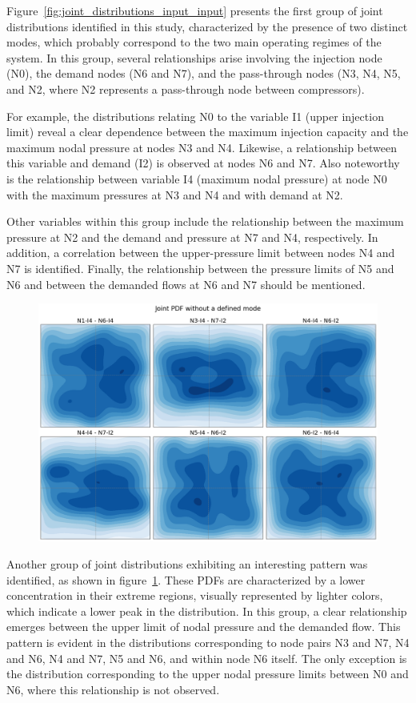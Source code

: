 Figure~\cref{fig:joint_distributions_input_input} presents the first group of joint distributions identified in this study, characterized by the presence of two distinct modes, which probably correspond to the two main operating regimes of the system. In this group, several relationships arise involving the injection node (N0), the demand nodes (N6 and N7), and the pass-through nodes (N3, N4, N5, and N2, where N2 represents a pass-through node between compressors).

For example, the distributions relating N0 to the variable I1 (upper injection limit) reveal a clear dependence between the maximum injection capacity and the maximum nodal pressure at nodes N3 and N4. Likewise, a relationship between this variable and demand (I2) is observed at nodes N6 and N7. Also noteworthy is the relationship between variable I4 (maximum nodal pressure) at node N0 with the maximum pressures at N3 and N4 and with demand at N2.

Other variables within this group include the relationship between the maximum pressure at N2 and the demand and pressure at N7 and N4, respectively. In addition, a correlation between the upper-pressure limit between nodes N4 and N7 is identified. Finally, the relationship between the pressure limits of N5 and N6 and between the demanded flows at N6 and N7 should be mentioned.

\begin{figure}
    \begin{center}
        \includegraphics[width=.7\textwidth]{figures/Chapter_NonLinealCensnet/PDF_inputs_inputs_no_mode.png}
    \end{center}
    \caption{}\label{fig:joint_distributions_input_input_no_mode}
\end{figure}
 

Another group of joint distributions exhibiting an interesting pattern was identified, as shown in figure~\cref{fig:joint_distributions_input_input_no_mode}. These PDFs are characterized by a lower concentration in their extreme regions, visually represented by lighter colors, which indicate a lower peak in the distribution. In this group, a clear relationship emerges between the upper limit of nodal pressure and the demanded flow. This pattern is evident in the distributions corresponding to node pairs N3 and N7, N4 and N6, N4 and N7, N5 and N6, and within node N6 itself. The only exception is the distribution corresponding to the upper nodal pressure limits between N0 and N6, where this relationship is not observed.

